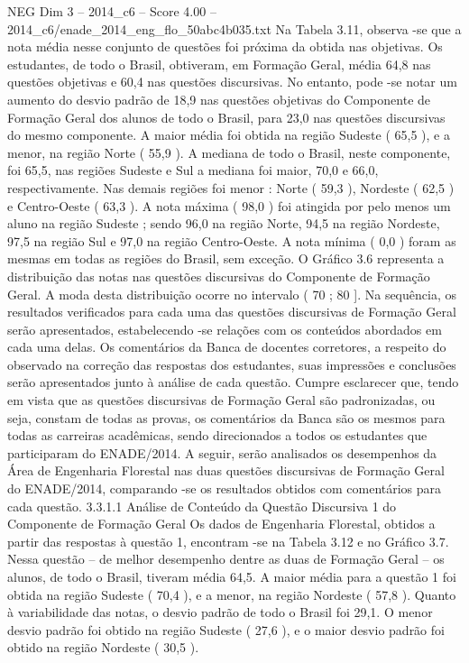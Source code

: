 \begin{textsample}{NEG Dim 3 – 2014\_c6 – Score 4.00 – 2014\_c6/enade\_2014\_eng\_flo\_50abc4b035.txt}
Na Tabela 3.11, observa -se que a nota média nesse conjunto de questões foi próxima da obtida nas objetivas.
Os estudantes, de todo o Brasil, obtiveram, em Formação Geral, média 64,8 nas questões objetivas e 60,4 nas questões discursivas.
No entanto, pode -se notar um aumento do desvio padrão de 18,9 nas questões objetivas do Componente de Formação Geral dos alunos de todo o Brasil, para 23,0 nas questões discursivas do mesmo componente.
A maior média foi obtida na região Sudeste ( 65,5 ), e a menor, na região Norte ( 55,9 ).
A mediana de todo o Brasil, neste componente, foi 65,5, nas regiões Sudeste e Sul a mediana foi maior, 70,0 e 66,0, respectivamente.
Nas demais regiões foi menor : Norte ( 59,3 ), Nordeste ( 62,5 ) e Centro-Oeste ( 63,3 ).
A nota máxima ( 98,0 ) foi atingida por pelo menos um aluno na região Sudeste ; sendo 96,0 na região Norte, 94,5 na região Nordeste, 97,5 na região Sul e 97,0 na região Centro-Oeste.
A nota mínima ( 0,0 ) foram as mesmas em todas as regiões do Brasil, sem exceção.
O Gráfico 3.6 representa a distribuição das notas nas questões discursivas do Componente de Formação Geral.
A moda desta distribuição ocorre no intervalo ( 70 ; 80 ].
Na sequência, os resultados verificados para cada uma das questões discursivas de Formação Geral serão apresentados, estabelecendo -se relações com os conteúdos abordados em cada uma delas.
Os comentários da Banca de docentes corretores, a respeito do observado na correção das respostas dos estudantes, suas impressões e conclusões serão apresentados junto à análise de cada questão.
Cumpre esclarecer que, tendo em vista que as questões discursivas de Formação Geral são padronizadas, ou seja, constam de todas as provas, os comentários da Banca são os mesmos para todas as carreiras acadêmicas, sendo direcionados a todos os estudantes que participaram do ENADE/2014.
A seguir, serão analisados os desempenhos da Área de Engenharia Florestal nas duas questões discursivas de Formação Geral do ENADE/2014, comparando -se os resultados obtidos com comentários para cada questão. 3.3.1.1 Análise de Conteúdo da Questão Discursiva 1 do Componente de Formação Geral Os dados de Engenharia Florestal, obtidos a partir das respostas à questão 1, encontram -se na Tabela 3.12 e no Gráfico 3.7.
Nessa questão – de melhor desempenho dentre as duas de Formação Geral – os alunos, de todo o Brasil, tiveram média 64,5.
A maior média para a questão 1 foi obtida na região Sudeste ( 70,4 ), e a menor, na região Nordeste ( 57,8 ).
Quanto à variabilidade das notas, o desvio padrão de todo o Brasil foi 29,1.
O menor desvio padrão foi obtido na região Sudeste ( 27,6 ), e o maior desvio padrão foi obtido na região Nordeste ( 30,5 ).

\end{textsample}
